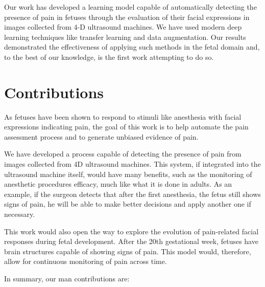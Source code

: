 Our work has developed a learning model capable of automatically detecting the presence of pain in fetuses through the evaluation of their facial expressions in images collected from 4-D ultrasound machines. We have used modern deep learning techniques like transfer learning and data augmentation. Our results demonstrated the effectiveness of applying such methods in the fetal domain and, to the best of our knowledge, is the first work attempting to do so.

\section{Contributions}

As fetuses have been shown to respond to stimuli like anesthesia with facial expressions indicating pain, the goal of this work is to help automate the pain assessment process and to generate unbiased evidence of pain. 

We have developed a process capable of detecting the presence of pain from images collected from 4D ultrasound machines. This system, if integrated into the ultrasound machine itself, would have many benefits, such as the monitoring of anesthetic procedures efficacy, much like what it is done in adults. As an example, if the surgeon detects that after the first anesthesia, the fetus still shows signs of pain, he will be able to make better decisions and apply another one if necessary.

This work would also open the way to explore the evolution of pain-related facial responses during fetal development. After the 20th gestational week, fetuses have brain structures capable of showing signs of pain. This model would, therefore, allow for continuous monitoring of pain across time.

In summary, our man contributions are:

